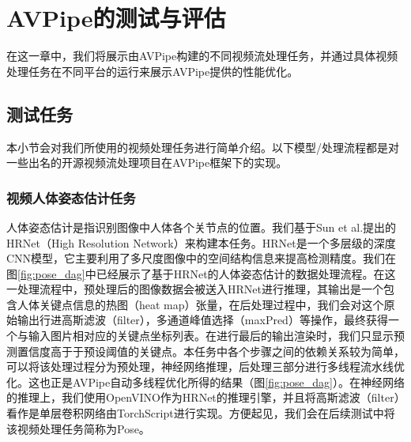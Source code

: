 
\chapter{AVPipe的测试与评估}

在这一章中，我们将展示由AVPipe构建的不同视频流处理任务，并通过具体视频处理任务在不同平台的运行来展示AVPipe提供的性能优化。

\section{测试任务}
本小节会对我们所使用的视频处理任务进行简单介绍。以下模型/处理流程都是对一些出名的开源视频流处理项目在AVPipe框架下的实现。

\subsection{视频人体姿态估计任务}
人体姿态估计是指识别图像中人体各个关节点的位置。我们基于Sun et al.提出的HRNet（High Resolution Network）\cite{sun2019deep}来构建本任务。HRNet是一个多层级的深度CNN模型，它主要利用了多尺度图像中的空间结构信息来提高检测精度。我们在图\ref{fig:pose_dag}中已经展示了基于HRNet的人体姿态估计的数据处理流程。在这一处理流程中，预处理后的图像数据会被送入HRNet进行推理，其输出是一个包含人体关键点信息的热图（heat map）张量，在后处理过程中，我们会对这个原始输出行进高斯滤波（filter），多通道峰值选择（maxPred）等操作，最终获得一个与输入图片相对应的关键点坐标列表。在进行最后的输出渲染时，我们只显示预测置信度高于于预设阈值的关键点。本任务中各个步骤之间的依赖关系较为简单，
可以将该处理过程分为预处理，神经网络推理，后处理三部分进行多线程流水线优化。这也正是AVPipe自动多线程优化所得的结果（图\ref{fig:pose_dag}）。在神经网络的推理上，我们使用OpenVINO作为HRNet的推理引擎，并且将高斯滤波（filter）看作是单层卷积网络由TorchScript进行实现。方便起见，我们会在后续测试中将该视频处理任务简称为Pose。

